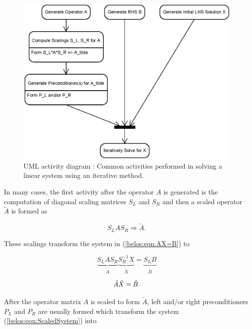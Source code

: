 \documentclass[pdf,ps2pdf,11pt]{SANDreport}
\begin{document}
{\bsinglespace
\begin{figure}[t]
\begin{center}
\includegraphics*[scale=0.85]{GeneralLinearSolveActivities}
\end{center}
\caption{
\label{belos:fig:GeneralLinearSolveActivities}
UML activity diagram : Common activities
performed in solving a linear system using an iterative method.}
\end{figure}
\esinglespace}

In many cases, the first activity after the operator $A$ is generated
is the computation of diagonal scaling matrices $S_L$ and $S_R$ and
then a scaled operator $\tilde{A}$ is formed as

\begin{equation}
S_L A S_R \Rightarrow \tilde{A}.
\label{belos:eqn:A_tilde}
\end{equation}

These scalings transform the system in ({}\ref{belos:eqn:AX=B}) to

\[
\underbrace{S_L A S_R}_{\displaystyle{\tilde{A}}}
\underbrace{S_R^{-1} X}_{\displaystyle{\tilde{X}}}
=
\underbrace{S_L B}_{\displaystyle{\tilde{B}}}
\]

\begin{equation}
\nonumber \\
\tilde{A} \tilde{X}  = \tilde{B}.
\label{belos:eqn:ScaledSystem}
\end{equation}

After the operator matrix $A$ is scaled to form $\tilde{A}$, left
and/or right preconditioners $P_L$ and $P_R$ are usually formed which
transform the system ({}\ref{belos:eqn:ScaledSystem}) into
\end{document}
